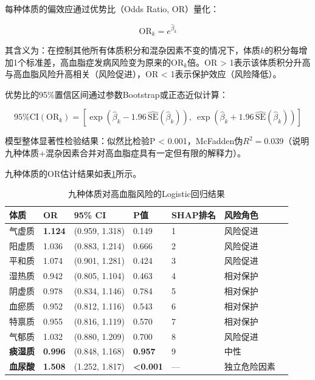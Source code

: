 \documentclass[12pt,a4paper]{ctexart}
\begin{document}
每种体质的偏效应通过优势比（Odds Ratio, OR）量化：

\begin{equation}
\text{OR}_k = e^{\hat{\beta}_k}
\label{eq:or}
\end{equation}

其含义为：在控制其他所有体质积分和混杂因素不变的情况下，体质$k$的积分每增加1个标准差，高血脂症发病风险变为原来的$\text{OR}_k$倍。OR > 1表示该体质积分升高与高血脂风险升高相关（风险促进），OR < 1表示保护效应（风险降低）。

优势比的95\%置信区间通过参数Bootstrap或正态近似计算：

\begin{equation}
\text{95\%CI}(\text{OR}_k) = \left[\exp\!\left(\hat{\beta}_k - 1.96\, \widehat{\text{SE}}(\hat{\beta}_k)\right),\ \exp\!\left(\hat{\beta}_k + 1.96\, \widehat{\text{SE}}(\hat{\beta}_k)\right)\right]
\label{eq:ci_or}
\end{equation}

模型整体显著性检验结果：似然比检验P < 0.001，McFadden伪$R^2 = 0.039$（说明九种体质+混杂因素合并对高血脂症具有一定但有限的解释力）。

九种体质的OR估计结果如表\ref{tab:constitution_or}所示。

\begin{table}[H]
\centering
\caption{九种体质对高血脂风险的Logistic回归结果}
\label{tab:constitution_or}
\begin{tabular}{lllllll}
\toprule
体质& OR & 95\% CI & P值 & SHAP排名 & 风险角色 \\
\midrule
气虚质 & \textbf{1.124} & (0.959, 1.318) & 0.149 & 1 & 风险促进 \\
阳虚质 & 1.036          & (0.883, 1.214) & 0.666 & 2 & 风险促进 \\
平和质 & 1.074          & (0.901, 1.281) & 0.424 & 3 & 风险促进 \\
湿热质 & 0.942          & (0.805, 1.104) & 0.463 & 4 & 相对保护 \\
阴虚质 & 0.978          & (0.834, 1.146) & 0.784 & 5 & 相对保护 \\
血瘀质 & 0.952          & (0.812, 1.116) & 0.543 & 6 & 相对保护 \\
特禀质 & 0.955          & (0.816, 1.119) & 0.570 & 7 & 相对保护 \\
气郁质 & 1.032          & (0.880, 1.209) & 0.700 & 8 & 风险促进 \\
\textbf{痰湿质} & \textbf{0.996} & (0.848, 1.168) & \textbf{0.957} & 9 & 中性 \\
\midrule
\textbf{血尿酸} & \textbf{1.508} & (1.252, 1.817) & \textbf{<0.001} & — & 独立危险因素 \\
\bottomrule
\end{tabular}
\end{table}
\end{document}
